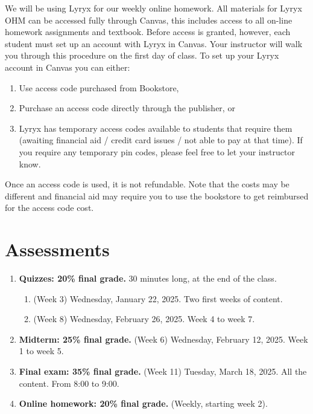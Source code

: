 \documentclass{article}
\begin{document}
	\noindent
	We will be using Lyryx for our weekly online homework. All materials for Lyryx
	OHM can be accessed fully through Canvas, this includes access to all on-line homework
	assignments and textbook. Before access is granted, however, each student must
	set up an account with Lyryx in Canvas. Your instructor will walk you through this
	procedure on the first day of class. To set up your Lyryx account in Canvas
	you can either:
	\begin{enumerate}
		\item Use access code purchased from Bookstore,

		\item Purchase an access code directly through the publisher, or

		\item Lyryx has temporary access codes available to students that require them
			(awaiting financial aid / credit card issues / not able to pay at that
			time). If you require any temporary pin codes, please feel free to let your
			instructor know.
	\end{enumerate}
	Once an access code is used, it is not refundable. Note that the costs may be different
	and financial aid may require you to use the bookstore to get reimbursed for the
	access code cost.

	\section*{Assessments}
	\begin{enumerate}
		\item \textbf{Quizzes: 20\% final grade.} 30 minutes long, at the end of the
			class.
			\begin{enumerate}
				\item (Week 3) Wednesday, January 22, 2025. Two first weeks of content.

				\item (Week 8) Wednesday, February 26, 2025. Week 4 to week 7.
			\end{enumerate}

		\item \textbf{Midterm: 25\% final grade.} (Week 6) Wednesday, February 12,
			2025. Week 1 to week 5.

		\item \textbf{Final exam: 35\% final grade.} (Week 11) Tuesday, March 18,
			2025. All the content. From 8:00 to 9:00.

		\item \textbf{Online homework: 20\% final grade.} (Weekly, starting week 2).
	\end{enumerate}
\end{document}
